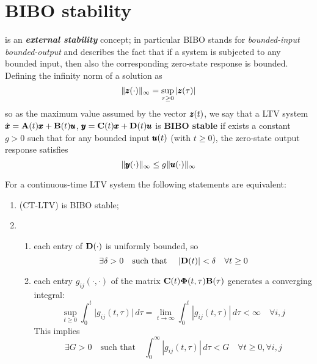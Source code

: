 \section{BIBO stability}
	 is an \textbf{\textit{external stability}} concept; in particular BIBO stands for \textit{bounded-input bounded-output} and describes the fact that if a system is subjected to any bounded input, then also the corresponding zero-state response is bounded. Defining the infinity norm of a solution as
	\begin{equation}
		\|\pmb{z}(\cdot)\|_\infty = \sup_{\tau \geq 0} |\pmb{z}(\tau)|
	\end{equation}
	so as the maximum  value assumed by the vector $\pmb{z}(t)$, we say that a LTV system $\dot{\pmb{x}} = \mathbf{A}(t)\pmb{x} + \mathbf{B}(t)\pmb{u}$, $\pmb{y} = \mathbf{C}(t)\pmb{x} + \mathbf{D}(t)\pmb{u}$ is \textbf{BIBO stable} if exists a constant $g > 0$ such that for any bounded input $\pmb{u}(t)$ (with $t\geq 0$), the zero-state output response satisfies
	\begin{equation} \label{eq:kal:BIBO}
		\|\pmb{y}(\cdot)\|_\infty \leq g \|\pmb{u}(\cdot)\|_\infty
	\end{equation}
	\begin{theorem} \label{th:kal:temp2}
		For a continuous-time LTV system the following statements are equivalent:
		\begin{enumerate}[\itshape i)]
			\item (CT-LTV) is BIBO stable;
			\item \begin{enumerate}[\itshape (a)]
				\item each entry of $\mathbf{D}(\cdot)$ is uniformly bounded, so
				\[\exists \delta > 0 \quad \textrm{such that } \quad |\mathbf{D}(t)| < \delta \quad \forall t \geq 0 \]
				\item each entry $g_{ij}(\cdot, \cdot)$ of the matrix $\mathbf{C}(t)\mathbf{\Phi}(t,\tau)\mathbf{B}(\tau)$ generates a converging integral:
				\[ \sup_{t\geq 0} \int_0^t \big|g_{ij}(t,\tau)\big| \, d\tau = \lim_{t\rightarrow \infty} \int_0^t |g_{ij}(t,\tau)|\, d\tau < \infty \quad \forall i, j \]
				This implies
				\[ \exists G > 0 \quad \textrm{such that} \quad \int_0^\infty |g_{ij}(t,\tau)|\, d\tau < G \quad \forall t \geq 0, \forall i,j \]
			\end{enumerate}
		\end{enumerate}
	\end{theorem}
